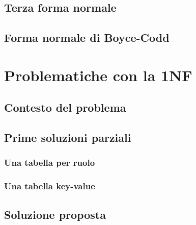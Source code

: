 \documentclass[10pt,twoside,cucitura]{toptesi}
\begin{document}
\section{Terza forma normale}


\section{Forma normale di Boyce-Codd}


%

\chapter{Problematiche con la 1NF}

\section{Contesto del problema}

\section{Prime soluzioni parziali}
\subsection{Una tabella per ruolo}
\subsection{Una tabella key-value}

\section{Soluzione proposta}
\label{sec:soluzione}

\cleardoublepage
{}
{}
\printbibliography
\end{document}
